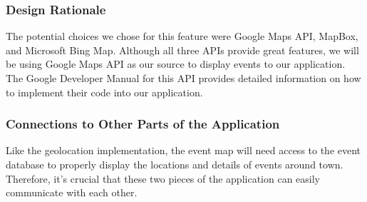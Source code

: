 \documentclass[draftclsnofoot, onecolumn, 10pt, compsoc]{IEEEtran}
\begin{document}
			\subsubsection{Design Rationale}
				The potential choices we chose for this feature were Google Maps API, MapBox, and Microsoft Bing Map. Although all three APIs provide great features, we will be using Google Maps API as our source to display events to our application. The Google Developer Manual for this API provides detailed information on how to implement their code into our application.
				~\cite{GoogleMap}
			\subsubsection{Connections to Other Parts of the Application}
				Like the geolocation implementation, the event map will need access to the event database to properly display the locations and details of events around town. Therefore, it's crucial that these two pieces of the application can easily communicate with each other.
				
	
	
	
\end{document}
